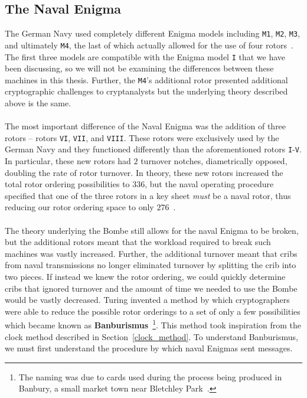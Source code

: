 \subsection{The Naval Enigma}
The German Navy used completely different Enigma models including
\texttt{M1}, \texttt{M2}, \texttt{M3}, and ultimately \texttt{M4},
the last of which actually allowed for the use of four rotors~\cite{cryptomuseumM4}. The
first three models are compatible with the Enigma model \texttt{I}
that we have been discussing, so we will not be examining the
differences between these machines in this thesis. Further, the
\texttt{M4}'s additional rotor presented additional cryptographic
challenges to cryptanalysts but the underlying theory described above
is the same.
\\\\The most important difference of the Naval Enigma was the
addition of three rotors -- rotors \texttt{VI}, \texttt{VII}, and
\texttt{VIII}. These rotors were exclusively used by the German Navy
and they functioned differently than the aforementioned rotors
\texttt{I}-\texttt{V}. In particular, these new rotors had $2$
turnover notches, diametrically opposed, doubling the rate of rotor
turnover. In theory, these new rotors increased the total rotor
ordering possibilities to $336$, but the naval operating procedure
specified that one of the three rotors in a key sheet \emph{must} be
a naval rotor, thus reducing our rotor ordering space to only $276$~\cite{cryptomuseumM4}.
\\\\The theory underlying the Bombe still allows for the naval Enigma
to be broken, but the additional rotors meant that the workload
required to break such machines was vastly increased. Further, the
additional turnover meant that cribs from naval transmissions no
longer eliminated turnover by splitting the crib into two pieces. If
instead we knew the rotor ordering, we could quickly determine cribs
that ignored turnover and the amount of time we needed to use the
Bombe would be vastly decreased. Turing invented a method by which
cryptographers
were able to reduce the possible rotor orderings to a set of only a
few possibilities which became known as {\bf{Banburismus}}~\cite[p.~76]{sebag-montefiore2000enigma}\footnote{The
  naming was due to cards used during the process being produced in
Banbury, a small market town near Bletchley Park~\cite[p.~76]{sebag-montefiore2000enigma}.}. This method took
inspiration from the clock method described in
Section~\ref{clock_method}. To understand Banburismus, we must first
understand the procedure by which naval Enigmas sent messages.
